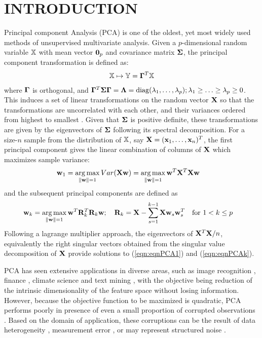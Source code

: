 \section*{\sffamily \Large INTRODUCTION}

Principal component Analysis (PCA) is one of the oldest, yet most widely used methods of unsupervised multivariate analysis. Given a $p$-dimensional random variable ${\mathbb{X}}$ with mean vector ${\bf 0}_p$ and covariance matrix ${\boldsymbol{\Sigma}}$, the principal component transformation is defined as:
%
\begin{align}
{\mathbb{X}} \mapsto {\mathbb{Y}} = {\boldsymbol{\Gamma}}^T {\mathbb{X}}
\end{align}
%
where ${\boldsymbol{\Gamma}}$ is orthogonal, and ${\boldsymbol{\Gamma}}^T {\boldsymbol{\Sigma}} {\boldsymbol{\Gamma}} = {\boldsymbol{\Lambda}} = \operatorname*{diag}( \lambda_1, \ldots, \lambda_p); \lambda_1 \geq \ldots \geq \lambda_p \geq 0$. This induces a set of linear transformations on the random vector ${\mathbf{X}}$ so that the transformations are uncorrelated with each other, and their variances ordered from highest to smallest \citep{MardiaKentBibby}. Given that ${\boldsymbol{\Sigma}}$ is positive definite, these transformations are given by the eigenvectors of ${\boldsymbol{\Sigma}}$ following its spectral decomposition. For a size-$n$ sample from the distribution of ${\mathbb{X}}$, say ${\mathbf{X}} = ({\bf{x}}_1, \ldots, {\bf{x}}_n)^T$, the first principal component gives the linear combination of columns of ${\mathbf{X}}$ which maximizes sample variance:
%
\begin{align}\label{eqn:eqnPCA1}
{\bf{w}}_1 &= \operatorname*{arg\,max}_{\| {\bf{w}} \| = 1} Var ({\mathbf{X}} {\bf{w}} ) = \operatorname*{arg\,max}_{\| {\bf{w}} \| = 1} {\bf{w}}^T {\mathbf{X}}^T {\mathbf{X}} {\bf{w}}
\end{align}
%
and the subsequent principal components are defined as
\begin{align}\label{eqn:eqnPCAk}
{\bf{w}}_k &= \operatorname*{arg\,max}_{\| {\bf{w}} \| = 1} {\bf{w}}^T {\mathbf{R}}_k^T {\mathbf{R}}_k {\bf{w}}; \quad {\mathbf{R}}_k = {\mathbf{X}} - \sum_{s=1}^{k-1} {\mathbf{X}} {\bf{w}}_s {\bf{w}}_s^T \quad \text{for } 1< k \leq p
\end{align}
%
Following a lagrange multiplier approach, the eigenvectors of ${\mathbf{X}}^T {\mathbf{X}}/n$, equivalently the right singular vectors obtained from the singular value decomposition of ${\mathbf{X}}$ provide solutions to (\ref{eqn:eqnPCA1}) and (\ref{eqn:eqnPCAk}).

PCA has seen extensive applications in diverse areas, such as image recognition \citep{AlkandariAljaber15}, finance \citep{AlexanderBook}, climate science \citep{WilksBook} and text mining \citep{BerryCastellanos}, with the objective being reduction of the intrinsic dimensionality of the feature space without losing information. However, because the objective function to be maximized is quadratic, PCA performs poorly in presence of even a small proportion of corrupted observations \citep{XuCaramanisMannor13}. Based on the domain of application, these corruptions can be the result of data heterogeneity \citep{SahaEtal16}, measurement error \citep{Bailey12,HelltonThoresen14}, or may represent structured noise \citep{CandesEtal09}.

